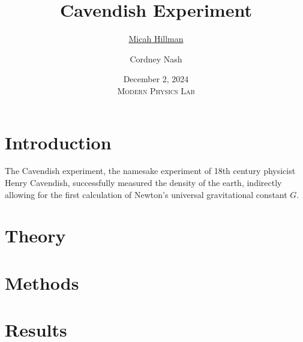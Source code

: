 \documentclass[12pt]{report}
\title{\textbf{Cavendish Experiment} \\\vspace{-0.6cm}}
\date{
    December 2, 2024 \\\vspace{0.5cm}
    \large{\textsc{Modern Physics Lab}}
}
\author{
    \ul{Micah Hillman} \and Cordney Nash
}
\begin{document}
\maketitle

\section*{Introduction}
{
    The Cavendish experiment, the namesake experiment of 18th century physicist Henry Cavendish, successfully measured the density of the earth, indirectly allowing for the first calculation of Newton's universal gravitational constant $G$.
}

\section*{Theory}
{

}

\section*{Methods}
{

}

\section*{Results}
{
    
}

\printbibliography
\end{document}
